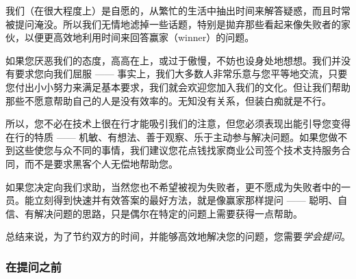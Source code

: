我们（在很大程度上）是自愿的，从繁忙的生活中抽出时间来解答疑惑，而且时常被提问淹没。所以我们无情地滤掉一些话题，特别是拋弃那些看起来像失败者的家伙，以便更高效地利用时间来回答赢家（winner）的问题。

如果您厌恶我们的态度，高高在上，或过于傲慢，不妨也设身处地想想。我们并没有要求您向我们屈服 —— 事实上，我们大多数人非常乐意与您平等地交流，只要您付出小小努力来满足基本要求，我们就会欢迎您加入我们的文化。但让我们帮助那些不愿意帮助自己的人是没有效率的。无知没有关系，但装白痴就是不行。

所以，您不必在技术上很在行才能吸引我们的注意，但您必须表现出能引导您变得在行的特质 —— 机敏、有想法、善于观察、乐于主动参与解决问题。如果您做不到这些使您与众不同的事情，我们建议您花点钱找家商业公司签个技术支持服务合同，而不是要求黑客个人无偿地帮助您。

如果您决定向我们求助，当然您也不希望被视为失败者，更不愿成为失败者中的一员。能立刻得到快速并有效答案的最好方法，就是像赢家那样提问 —— 聪明、自信、有解决问题的思路，只是偶尔在特定的问题上需要获得一点帮助。

总结来说，为了节约双方的时间，并能够高效地解决您的问题，您需要\emph{学会提问}。


\subsubsection{在提问之前}

